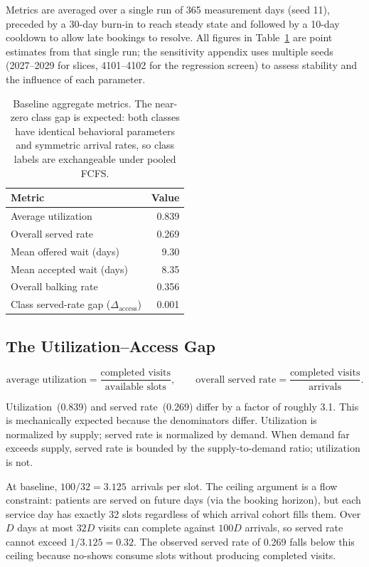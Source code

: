 \documentclass[11pt]{article}
\begin{document}
Metrics are averaged over a single run of 365 measurement days (seed 11),
preceded by a 30-day burn-in to reach steady state and followed by a
10-day cooldown to allow late bookings to resolve. All figures in
Table~\ref{tab:baseline} are point estimates from that single run; the
sensitivity appendix uses multiple seeds (2027--2029 for slices, 4101--4102
for the regression screen) to assess stability and the influence of each parameter.

\begin{table}[H]
\centering
\renewcommand{\arraystretch}{1.15}
\begin{tabular}{lr}
\toprule
Metric & Value \\
\midrule
Average utilization & 0.839 \\
Overall served rate & 0.269 \\
Mean offered wait (days) & 9.30 \\
Mean accepted wait (days) & 8.35 \\
Overall balking rate & 0.356 \\
Class served-rate gap ($\Delta_{\text{access}}$) & 0.001 \\
\bottomrule
\end{tabular}
\caption{Baseline aggregate metrics. The near-zero class gap is expected:
both classes have identical behavioral parameters and symmetric arrival rates,
so class labels are exchangeable under pooled FCFS.}
\label{tab:baseline}
\end{table}

\subsection{The Utilization--Access Gap}

\[
  \text{average utilization}
  = \frac{\text{completed visits}}{\text{available slots}},
  \qquad
  \text{overall served rate}
  = \frac{\text{completed visits}}{\text{arrivals}}.
\]

Utilization~(0.839) and served rate~(0.269) differ by a factor of roughly
3.1. This is mechanically expected because the denominators differ.
Utilization is normalized by supply; served rate is normalized by demand.
When demand far exceeds supply, served rate is bounded by the
supply-to-demand ratio; utilization is not.

At baseline, $100/32 = 3.125$~arrivals per slot. The ceiling argument is
a flow constraint: patients are served on future days (via the booking
horizon), but each service day has exactly 32 slots regardless of which
arrival cohort fills them. Over $D$ days at most $32D$ visits can complete
against $100D$ arrivals, so served rate cannot exceed $1/3.125 = 0.32$.
The observed served rate of 0.269 falls below this ceiling because
no-shows consume slots without producing completed visits.
\end{document}
